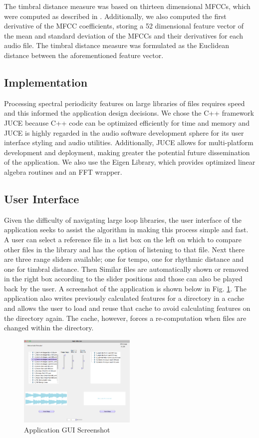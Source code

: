 \documentclass{article}
\begin{document}
The timbral distance measure was based on thirteen dimensional MFCCs, which were computed as described in \cite{jensen2009quantitative}. Additionally, we also computed the first derivative of the MFCC coefficients, storing a 52 dimensional feature vector of the mean and standard deviation of the MFCCs and their derivatives for each audio file. The timbral distance measure was formulated as the Euclidean distance between the aforementioned feature vector.

\subsection{Implementation}

Processing spectral periodicity features on large libraries of files requires speed and this informed the application design decisions. We chose the C++ framework JUCE \cite{juce} because C++ code can be optimized efficiently for time and memory and JUCE is highly regarded in the audio software development sphere for its user interface styling and audio utilities. Additionally, JUCE allows for multi-platform development and deployment, making greater the potential future dissemination of the application. We also use the Eigen Library\cite{eigenweb}, which provides optimized linear algebra routines and an FFT wrapper.

\subsection{User Interface}
Given the difficulty of navigating large loop libraries, the user interface of the application seeks to assist the algorithm in making this process simple and fast. A user can select a reference file in a list box on the left on which to compare other files in the library and has the option of listening to that file. Next there are three range sliders available; one for tempo, one for rhythmic distance and one for timbral distance. Then Similar files are automatically shown or removed in the right box according to the slider positions and those can also be played back by the user. A screenshot of the application is shown below in Fig. \ref{fig:gui}. The application also writes previously calculated features for a directory in a cache and allows the user to load and reuse that cache to avoid calculating features on the directory again. The cache, however, forces a re-computation when files are changed within the directory.

\begin{figure}[h!]
  \centering
    \centerline{\includegraphics[width=0.5\textwidth]{fLoop_gui.png}}
      \caption{Application GUI Screenshot}\label{fig:gui}
\end{figure}
\end{document}
